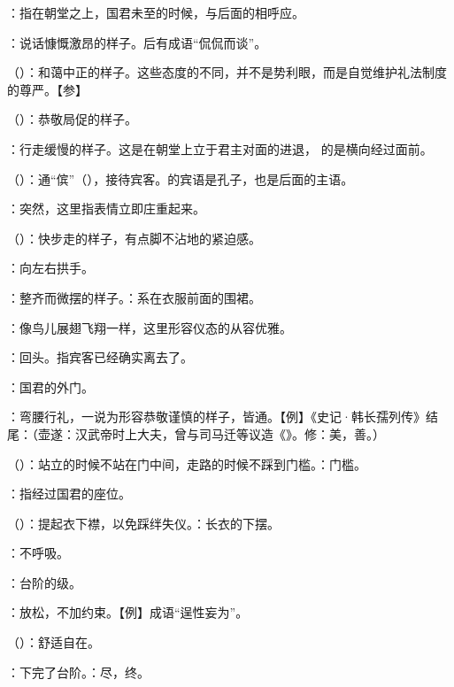 {
\item {}：指在朝堂之上，国君未至的时候，与后面的相呼应。
\item {}：说话慷慨激昂的样子。后有成语“侃侃而谈”。
\item {}（）：和蔼中正的样子。这些态度的不同，并不是势利眼，而是自觉维护礼法制度的尊严。【参】 
\item {}（）：恭敬局促的样子。
\item {}：行走缓慢的样子。这是在朝堂上立于君主对面的进退， 的是横向经过面前。
}
{}  %


{
\item {}（）：通“傧”（），接待宾客。的宾语是孔子，也是后面的主语。
\item {}：突然，这里指表情立即庄重起来。
\item {}（）：快步走的样子，有点脚不沾地的紧迫感。
\item {}：向左右拱手。
\item {}：整齐而微摆的样子。：系在衣服前面的围裙。
\item {}：像鸟儿展翅飞翔一样，这里形容仪态的从容优雅。
\item {}：回头。指宾客已经确实离去了。
}
{}


{
\item {}：国君的外门。
\item {}：弯腰行礼，一说为形容恭敬谨慎的样子，皆通。【例】《史记·韩长孺列传》结尾：（壶遂：汉武帝时上大夫，曾与司马迁等议造《》。修：美，善。）%
\item {}（）：站立的时候不站在门中间，走路的时候不踩到门槛。：门槛。
\item {}：指经过国君的座位。
\item {}（）：提起衣下襟，以免踩绊失仪。：长衣的下摆。
\item {}：不呼吸。
\item {}：台阶的级。
\item {}：放松，不加约束。【例】成语“逞性妄为”。
\item {}（）：舒适自在。
\item {}：下完了台阶。：尽，终。
}
{}


